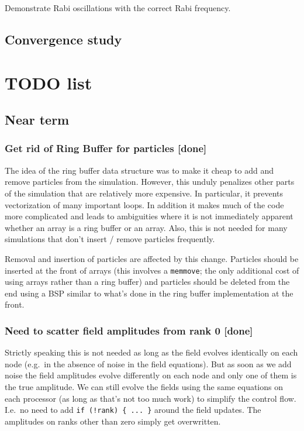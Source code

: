 \documentclass[aps, superscriptaddress, groupedaddress, preprint]{revtex4}
\begin{document}
Demonstrate Rabi oscillations with the correct Rabi frequency.


\subsection{Convergence study}


\section{TODO list}

\subsection{Near term}

\subsubsection{Get rid of Ring Buffer for particles {\bf [done]}}

The idea of the ring buffer data structure was to make it cheap
to add and remove particles from the simulation.  However, this
unduly penalizes other parts of the simulation that are
relatively more expensive.  In particular, it prevents
vectorization of many important loops.  In addition it makes much
of the code more complicated and leads to ambiguities where it is
not immediately apparent whether an array is a ring buffer or an
array.  Also, this is not needed for many simulations that don't
insert / remove particles frequently.

Removal and insertion of particles are affected by this change.
Particles should be inserted at the front of arrays (this
involves a \verb~memmove~; the only additional cost of using
arrays rather than a ring buffer) and particles should be deleted
from the end using a BSP similar to what's done in the ring
buffer implementation at the front.


\subsubsection{Need to scatter field amplitudes from rank 0 {\bf
[done]}}

Strictly speaking this is not needed as long as the field evolves
identically on each node (e.g.\ in the absence of noise in the
field equations).  But as soon as we add noise the field
amplitudes evolve differently on each node and only one of them
is the true amplitude.  We can still evolve the fields using the
same equations on each processor (as long as that's not too much
work) to simplify the control flow.  I.e.\ no need to add 
\verb~if (!rank) { ... }~ around the field updates.  The
amplitudes on ranks other than zero simply get overwritten.
\end{document}

